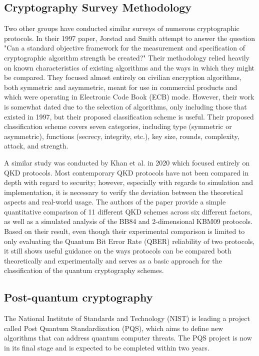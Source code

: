\documentclass[sigconf]{acmart}
\begin{document}
\subsection{Cryptography Survey Methodology}
Two other groups have conducted similar surveys of numerous cryptographic protocols. In their 1997 paper, Jorstad and Smith\cite{jorstad_cryptographic_1997} attempt to answer the question "Can a standard objective framework for the measurement and specification of cryptographic algorithm strength be created?" Their methodology relied heavily on known characteristics of existing algorithms and the ways in which they might be compared. They focused almost entirely on civilian encryption algorithms, both symmetric and asymmetric, meant for use in commercial products and which were operating in Electronic Code Book (ECB) mode. However, their work is somewhat dated due to the selection of algorithms, only including those that existed in 1997, but their proposed classification scheme is useful. Their proposed classification scheme covers seven categories, including type (symmetric or asymmetric), functions (secrecy, integrity, etc.), key size, rounds, complexity, attack, and strength.

A similar study was conducted by Khan et al.\cite{khan_security_2020} in 2020 which focused entirely on QKD protocols. Most contemporary QKD protocols have not been compared in depth with regard to security; however, especially with regards to simulation and implementation, it is necessary to verify the deviation between the theoretical aspects and real-world usage. The authors of the paper provide a simple quantitative comparison of 11 different QKD schemes across six different factors, as well as a simulated analysis of the BB84 and 2-dimensional KBM09 protocols. Based on their result, even though their experimental comparison is limited to only evaluating the Quantum Bit Error Rate (QBER) reliability of two protocols, it still shows useful guidance on the ways protocols can be compared both theoretically and experimentally and serves as a basic approach for the classification of the quantum cryptography schemes.

\subsection{Post-quantum cryptography}
The National Institute of Standards and Technology (NIST) is leading a project called Post Quantum Standardization (PQS), which aims to define new algorithms that can address quantum computer threats. The PQS project is now in its final stage and is expected to be completed within two years\cite{moody_nist_2020}.
\end{document}
